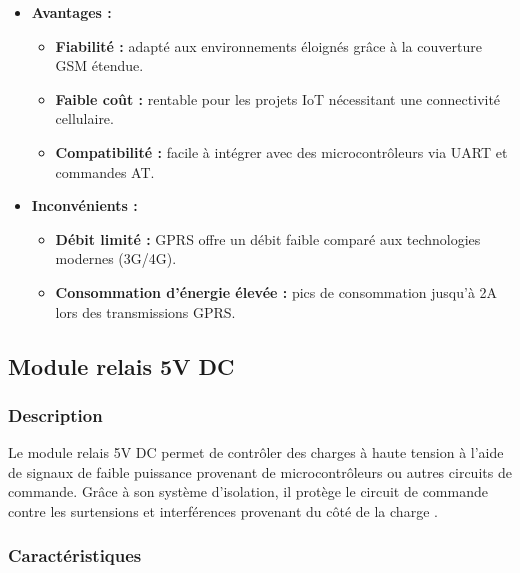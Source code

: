 \begin{itemize}
	\item \textbf{Avantages :}
	\begin{itemize}
		\item \textbf{Fiabilité :} adapté aux environnements éloignés grâce à la couverture GSM étendue.
		\item \textbf{Faible coût :} rentable pour les projets IoT nécessitant une connectivité cellulaire.
		\item \textbf{Compatibilité :} facile à intégrer avec des microcontrôleurs via UART et commandes AT.
	\end{itemize}
	
	\item \textbf{Inconvénients :}
	\begin{itemize}
		\item \textbf{Débit limité :} GPRS offre un débit faible comparé aux technologies modernes (3G/4G).
		\item \textbf{Consommation d’énergie élevée :} pics de consommation jusqu’à 2A lors des transmissions GPRS.
	\end{itemize}
	
 \end{itemize}


\subsection{Module relais 5V DC}
\subsubsection*{Description}
Le module relais 5V DC permet de contrôler des charges à haute tension à l'aide de signaux de faible puissance provenant de microcontrôleurs ou autres circuits de commande. Grâce à son système d'isolation, il protège le circuit de commande contre les surtensions et interférences provenant du côté de la charge \cite{2}.

\subsubsection*{Caractéristiques}

